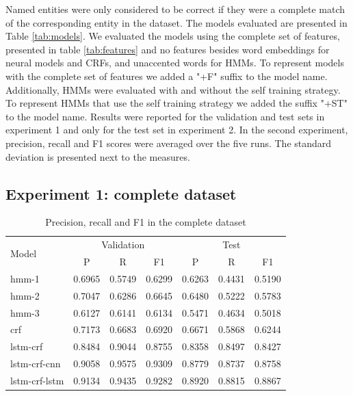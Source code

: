 \documentclass[sigconf]{acmart}
\begin{document}
Named entities were only considered to be correct if they were a complete match of the 
corresponding entity in the dataset. The models evaluated are presented in Table \ref{tab:models}.
We evaluated the models using the complete set of features, presented in 
table \ref{tab:features} and no features besides word embeddings for neural models and
CRFs, and unaccented words for HMMs. To represent models with the complete set of features
we added a "+F" suffix to the model name. Additionally, HMMs were evaluated with and
without the self training strategy. To represent HMMs that use the self training strategy
we added the suffix "+ST" to the model name.
Results were reported for the validation and test sets in experiment 1 and only for the
test set in experiment 2. In the second experiment, precision, recall and F1 scores were 
averaged over the five runs. The standard deviation is presented next to the measures.

\subsection{Experiment 1: complete dataset}

\begin{table}[h]
  \small
  \begin{center}
    \begin{tabular}{ lllllll }
      \toprule
      \multirow{2}{*}{Model} & \multicolumn{3}{c}{Validation} & \multicolumn{3}{c}{Test} \\
                             & \multicolumn{1}{c}{P} & \multicolumn{1}{c}{R} & \multicolumn{1}{c}{F1}
                             & \multicolumn{1}{c}{P} & \multicolumn{1}{c}{R} & \multicolumn{1}{c}{F1} \\
      \midrule
      hmm-1	    & 0.6965 & 0.5749 & 0.6299 & 0.6263 & 0.4431 & 0.5190 \\
      hmm-2	    & 0.7047 & 0.6286 & 0.6645 & 0.6480 & 0.5222 & 0.5783 \\
      hmm-3	    & 0.6127 & 0.6141 & 0.6134 & 0.5471 & 0.4634 & 0.5018 \\
      crf	    & 0.7173 & 0.6683 & 0.6920 & 0.6671 & 0.5868 & 0.6244 \\
      lstm-crf	    & 0.8484 & 0.9044 & 0.8755 & 0.8358 & 0.8497 & 0.8427 \\
      lstm-crf-cnn  & 0.9058 & 0.9575 & 0.9309 & 0.8779 & 0.8737 & 0.8758 \\
      lstm-crf-lstm & 0.9134 & 0.9435 & 0.9282 & 0.8920 & 0.8815 & 0.8867 \\
      \bottomrule
    \end{tabular}
  \end{center}
  \caption{Precision, recall and F1 in the complete dataset}
  \label{tab:experiment1}
\end{table}
\end{document}
